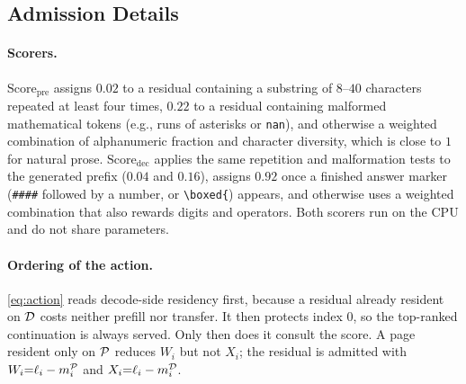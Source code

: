 \subsection{Admission Details}
\label{sec:app-detail}

\paragraph{Scorers.}
$\mathrm{Score}_{\mathrm{pre}}$ assigns $0.02$ to a residual containing a substring of $8$--$40$ characters repeated at least four times, $0.22$ to a residual containing malformed mathematical tokens (e.g., runs of asterisks or \texttt{nan}), and otherwise a weighted combination of alphanumeric fraction and character diversity, which is close to $1$ for natural prose.
$\mathrm{Score}_{\mathrm{dec}}$ applies the same repetition and malformation tests to the generated prefix ($0.04$ and $0.16$), assigns $0.92$ once a finished answer marker (\texttt{\#\#\#\#} followed by a number, or \texttt{\textbackslash boxed\{}) appears, and otherwise uses a weighted combination that also rewards digits and operators.
Both scorers run on the CPU and do not share parameters.

\paragraph{Ordering of the action.}
\eqref{eq:action} reads decode-side residency first, because a residual already resident on $\mathcal{D}$ costs neither prefill nor transfer.
It then protects index $0$, so the top-ranked continuation is always served.
Only then does it consult the score.
A page resident only on $\mathcal{P}$ reduces $W_i$ but not $X_i$; the residual is admitted with $W_i{=}\ell_i-m_i^{\mathcal{P}}$ and $X_i{=}\ell_i-m_i^{\mathcal{D}}$.



